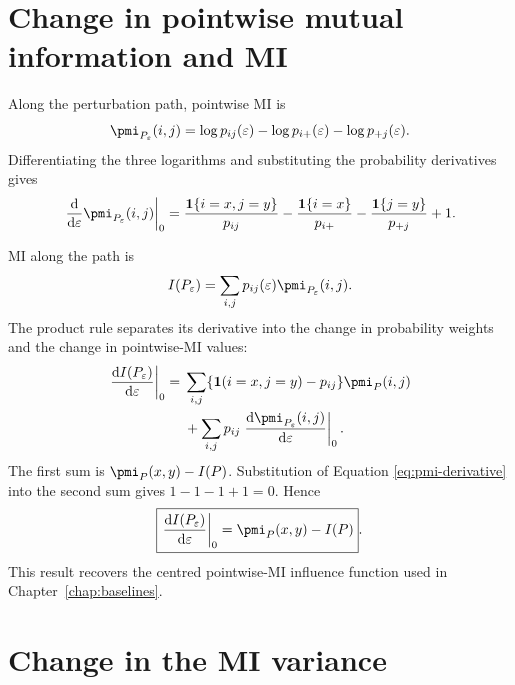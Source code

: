 \section{Change in pointwise mutual information and MI}

Along the perturbation path, pointwise MI is
\begin{equation}
  \pmi_{P_\varepsilon}(i,j)
  =\log p_{ij}(\varepsilon)
  -\log p_{i+}(\varepsilon)
  -\log p_{+j}(\varepsilon).
\end{equation}
Differentiating the three logarithms and substituting the probability
derivatives gives
\begin{equation}
  \left.
  \frac{\mathrm d}{\mathrm d\varepsilon}
  \pmi_{P_\varepsilon}(i,j)
  \right|_{0}
  =
  \frac{\mathbf 1\{i=x,j=y\}}{p_{ij}}
  -\frac{\mathbf 1\{i=x\}}{p_{i+}}
  -\frac{\mathbf 1\{j=y\}}{p_{+j}}
  +1.
  \label{eq:pmi-derivative}
\end{equation}

MI along the path is
\begin{equation}
  I(P_\varepsilon)
  =\sum_{i,j}p_{ij}(\varepsilon)
  \pmi_{P_\varepsilon}(i,j).
\end{equation}
The product rule separates its derivative into the change in probability
weights and the change in pointwise-MI values:
\begin{align}
  \left.\frac{\mathrm d I(P_\varepsilon)}{\mathrm d\varepsilon}
  \right|_{0}
  ={}&
  \sum_{i,j}
  \{\mathbf 1(i=x,j=y)-p_{ij}\}\pmi_P(i,j)
  \notag\\
  &+
  \sum_{i,j}p_{ij}
  \left.\frac{\mathrm d\pmi_{P_\varepsilon}(i,j)}
  {\mathrm d\varepsilon}\right|_{0}.
\end{align}
The first sum is \(\pmi_P(x,y)-I(P)\). Substitution of Equation
\eqref{eq:pmi-derivative} into the second sum gives \(1-1-1+1=0\). Hence
\begin{equation}
  \boxed{
  \left.\frac{\mathrm d I(P_\varepsilon)}{\mathrm d\varepsilon}
  \right|_{0}
  =\pmi_P(x,y)-I(P)
  }.
  \label{eq:mi-derivative}
\end{equation}
This result recovers the centred pointwise-MI influence function used in
Chapter~\ref{chap:baselines}.

\section{Change in the MI variance}

